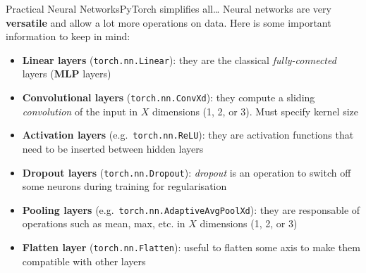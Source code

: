 \begin{frame}{Practical Neural Networks}{PyTorch simplifies all\dots}
    Neural networks are very \textbf{versatile} and allow a lot more operations on data.
    Here is some important information to keep in mind:

    \vfill

    \begin{itemize}
        \item \textbf{Linear layers} (\texttt{torch.nn.Linear}): they are the classical \emph{fully-connected} layers (\textbf{MLP} layers)
        \item \textbf{Convolutional layers} (\texttt{torch.nn.ConvXd}): they compute a sliding \emph{convolution} of the input in $X$ dimensions (1, 2, or 3). Must specify kernel size
        \item \textbf{Activation layers} (e.g.\ \texttt{torch.nn.ReLU}): they are activation functions that need to be inserted between hidden layers
        \item \textbf{Dropout layers} (\texttt{torch.nn.Dropout}): \emph{dropout} is an operation to switch off some neurons during training for regularisation
        \item \textbf{Pooling layers} (e.g.\ \texttt{torch.nn.AdaptiveAvgPoolXd}): they are responsable of operations such as mean, max, etc. in $X$ dimensions (1, 2, or 3)
        \item \textbf{Flatten layer} (\texttt{torch.nn.Flatten}): useful to flatten some axis to make them compatible with other layers
    \end{itemize}
\end{frame}

